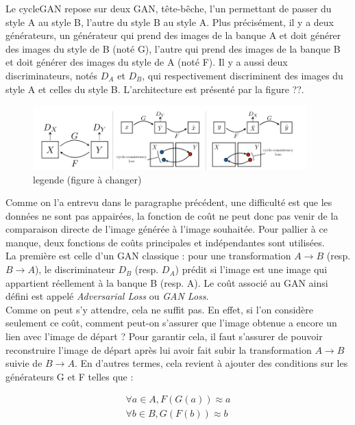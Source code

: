 Le cycleGAN repose sur deux GAN, tête-bêche, l'un permettant de passer du style A au style B, l'autre du style B au style A. Plus précisément, il y a deux générateurs, un générateur qui prend des images de la banque A et doit générer des images du style de B (noté G), l'autre qui prend des images de la banque B et doit générer des images du style de A (noté F). Il y a aussi deux discriminateurs, notés $D_A$ et $D_B$, qui respectivement discriminent des images du style A et celles du style B. L'architecture est présenté par la figure ??.

\begin{figure}[!h]
\centering
\includegraphics[width=300pt]{"images/cycleGAN_principe"}
\caption{legende (figure à changer)}
\end{figure}

Comme on l'a entrevu dans le paragraphe précédent, une difficulté est que les données ne sont pas appairées, la fonction de coût ne peut donc pas venir de la comparaison directe de l'image générée à l'image souhaitée. Pour pallier à ce manque, deux fonctions de coûts principales et indépendantes sont utilisées.\\
La première est celle d'un GAN classique : pour une transformation $ A \rightarrow B $ (resp. $ B \rightarrow A $), le discriminateur $ D_B $ (resp. $ D_A $) prédit si l'image est une image qui appartient réellement à la banque B (resp. A). Le coût associé au GAN ainsi défini est appelé \textit{Adversarial Loss} ou \textit{GAN Loss}.\\

Comme on peut s'y attendre, cela ne suffit pas. En effet, si l'on considère seulement ce coût, comment peut-on s'assurer que l'image obtenue a encore un lien avec l'image de départ ? Pour garantir cela, il faut s'assurer de pouvoir reconstruire l'image de départ après lui avoir fait subir  la transformation $ A \rightarrow B $ suivie de $ B \rightarrow A $. En d'autres termes, cela revient à ajouter des conditions sur les générateurs G et F telles que :

\begin{equation}
\begin{split}
\forall a \in A, F(G(a)) \approx a \\
\forall b \in B, G(F(b)) \approx b
\end{split}
\end{equation}

